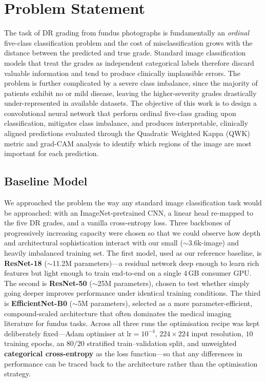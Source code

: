 \section{Problem Statement}
The task of DR grading from fundus photographs is fundamentally an \emph{ordinal} five-class classification problem and the cost of misclassification grows with the distance between the predicted and true grade. Standard image classification models that treat the grades as independent categorical labels therefore discard valuable information and tend to produce clinically implausible errors. 
The problem is further complicated by a severe class imbalance, since the majority of patients exhibit no or mild disease, leaving the higher-severity grades drastically under-represented in available datasets. The objective of this work is to design a convolutional neural network that perform ordinal five-class grading upon classification, mitigates class imbalance, and produces interpretable, clinically aligned predictions evaluated through the Quadratic Weighted Kappa (QWK) metric and grad-CAM analysis to identify which regions of the image are most important for each prediction.

\subsection{Baseline Model}
We approached the problem the way any standard image classification task would be approached: with an ImageNet-pretrained CNN, a linear head re-mapped to the five DR grades, and a vanilla cross-entropy loss. Three backbones of progressively increasing capacity were chosen so that we could observe how depth and architectural sophistication interact with our small ($\sim$3.6k-image) and heavily imbalanced training set. The first model, used as our reference baseline, is \textbf{ResNet-18} ($\sim$11.2M parameters)---a residual network deep enough to learn rich features but light enough to train end-to-end on a single 4\,GB consumer GPU. The second is \textbf{ResNet-50} ($\sim$25M parameters), chosen to test whether simply going deeper improves performance under identical training conditions. The third is \textbf{EfficientNet-B0} ($\sim$5M parameters), selected as a more parameter-efficient, compound-scaled architecture that often dominates the medical imaging literature for fundus tasks. Across all three runs the optimisation recipe was kept deliberately fixed---Adam optimiser at $\text{lr}=10^{-4}$, $224 \times 224$ input resolution, $10$ training epochs, an $80/20$ stratified train--validation split, and unweighted \textbf{categorical cross-entropy} as the loss function---so that any differences in performance can be traced back to the architecture rather than the optimisation strategy.

